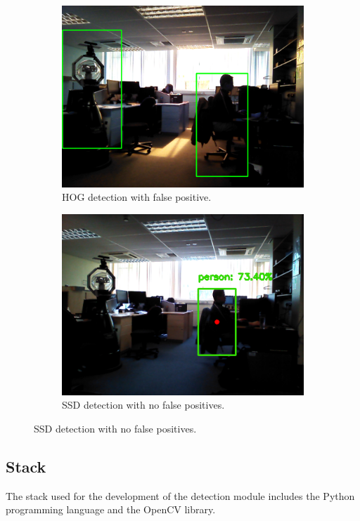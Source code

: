 \begin{figure}[H]
    \begin{subfigure}{.5\textwidth}
        \centering
        \includegraphics[width=.85\linewidth]{images/chapter3_hog.png}
        \caption{HOG detection with false positive.}
	\end{subfigure}
    \begin{subfigure}{.5\textwidth}
        \centering
        \includegraphics[width=.85\linewidth]{images/chapter3_dnn.png}
        \caption{SSD detection with no false positives.}
	\end{subfigure}
    \label{fig:hog}
\end{figure}

\subsection{Stack}

The stack used for the development of the detection module includes the Python programming language and the OpenCV library.


